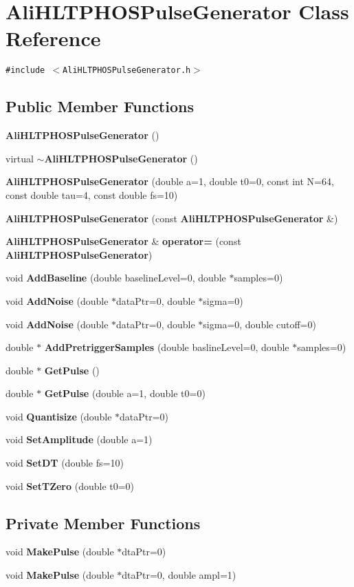 \section{Ali\-HLTPHOSPulse\-Generator Class Reference}
\label{classAliHLTPHOSPulseGenerator}
{\tt \#include $<$Ali\-HLTPHOSPulse\-Generator.h$>$}

\subsection*{Public Member Functions}
\begin{CompactItemize}
\item 
{\bf Ali\-HLTPHOSPulse\-Generator} ()
\item 
virtual {\bf $\sim$Ali\-HLTPHOSPulse\-Generator} ()
\item 
{\bf Ali\-HLTPHOSPulse\-Generator} (double a=1, double t0=0, const int N=64, const double tau=4, const double fs=10)
\item 
{\bf Ali\-HLTPHOSPulse\-Generator} (const {\bf Ali\-HLTPHOSPulse\-Generator} \&)
\item 
{\bf Ali\-HLTPHOSPulse\-Generator} \& {\bf operator=} (const {\bf Ali\-HLTPHOSPulse\-Generator})
\item 
void {\bf Add\-Baseline} (double baseline\-Level=0, double $\ast$samples=0)
\item 
void {\bf Add\-Noise} (double $\ast$data\-Ptr=0, double $\ast$sigma=0)
\item 
void {\bf Add\-Noise} (double $\ast$data\-Ptr=0, double $\ast$sigma=0, double cutoff=0)
\item 
double $\ast$ {\bf Add\-Pretrigger\-Samples} (double basline\-Level=0, double $\ast$samples=0)
\item 
double $\ast$ {\bf Get\-Pulse} ()
\item 
double $\ast$ {\bf Get\-Pulse} (double a=1, double t0=0)
\item 
void {\bf Quantisize} (double $\ast$data\-Ptr=0)
\item 
void {\bf Set\-Amplitude} (double a=1)
\item 
void {\bf Set\-DT} (double fs=10)
\item 
void {\bf Set\-TZero} (double t0=0)
\end{CompactItemize}
\subsection*{Private Member Functions}
\begin{CompactItemize}
\item 
void {\bf Make\-Pulse} (double $\ast$dta\-Ptr=0)
\item 
void {\bf Make\-Pulse} (double $\ast$dta\-Ptr=0, double ampl=1)
\end{CompactItemize}
